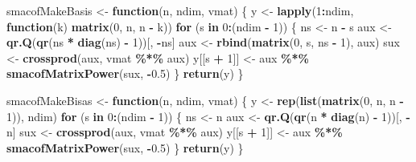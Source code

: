 \documentclass[
  12pt,
]{article}
\newenvironment{Shaded}{\begin{snugshade}}{\end{snugshade}}
\newcommand{\ControlFlowTok}[1]{\textcolor[rgb]{0.13,0.29,0.53}{\textbf{#1}}}
\newcommand{\DecValTok}[1]{\textcolor[rgb]{0.00,0.00,0.81}{#1}}
\newcommand{\FloatTok}[1]{\textcolor[rgb]{0.00,0.00,0.81}{#1}}
\newcommand{\FunctionTok}[1]{\textcolor[rgb]{0.13,0.29,0.53}{\textbf{#1}}}
\newcommand{\NormalTok}[1]{#1}
\newcommand{\OtherTok}[1]{\textcolor[rgb]{0.56,0.35,0.01}{#1}}
\newcommand{\SpecialCharTok}[1]{\textcolor[rgb]{0.81,0.36,0.00}{\textbf{#1}}}
\begin{document}
\begin{Shaded}
\begin{Highlighting}[]
\NormalTok{smacofMakeBasis }\OtherTok{\textless{}{-}} \ControlFlowTok{function}\NormalTok{(n, ndim, vmat) \{}
\NormalTok{  y }\OtherTok{\textless{}{-}} \FunctionTok{lapply}\NormalTok{(}\DecValTok{1}\SpecialCharTok{:}\NormalTok{ndim, }\ControlFlowTok{function}\NormalTok{(k)}
    \FunctionTok{matrix}\NormalTok{(}\DecValTok{0}\NormalTok{, n, n }\SpecialCharTok{{-}}\NormalTok{ k))}
  \ControlFlowTok{for}\NormalTok{ (s }\ControlFlowTok{in} \DecValTok{0}\SpecialCharTok{:}\NormalTok{(ndim }\SpecialCharTok{{-}} \DecValTok{1}\NormalTok{)) \{}
\NormalTok{    ns }\OtherTok{\textless{}{-}}\NormalTok{ n }\SpecialCharTok{{-}}\NormalTok{ s}
\NormalTok{    aux }\OtherTok{\textless{}{-}} \FunctionTok{qr.Q}\NormalTok{(}\FunctionTok{qr}\NormalTok{(ns }\SpecialCharTok{*} \FunctionTok{diag}\NormalTok{(ns) }\SpecialCharTok{{-}} \DecValTok{1}\NormalTok{))[, }\SpecialCharTok{{-}}\NormalTok{ns]}
\NormalTok{    aux }\OtherTok{\textless{}{-}} \FunctionTok{rbind}\NormalTok{(}\FunctionTok{matrix}\NormalTok{(}\DecValTok{0}\NormalTok{, s, ns }\SpecialCharTok{{-}} \DecValTok{1}\NormalTok{), aux)}
\NormalTok{    sux }\OtherTok{\textless{}{-}} \FunctionTok{crossprod}\NormalTok{(aux, vmat }\SpecialCharTok{\%*\%}\NormalTok{ aux)}
\NormalTok{    y[[s }\SpecialCharTok{+} \DecValTok{1}\NormalTok{]] }\OtherTok{\textless{}{-}}\NormalTok{ aux }\SpecialCharTok{\%*\%} \FunctionTok{smacofMatrixPower}\NormalTok{(sux, }\SpecialCharTok{{-}}\FloatTok{0.5}\NormalTok{)}
\NormalTok{  \}}
  \FunctionTok{return}\NormalTok{(y)}
\NormalTok{\}}

\NormalTok{smacofMakeBisas }\OtherTok{\textless{}{-}} \ControlFlowTok{function}\NormalTok{(n, ndim, vmat) \{}
\NormalTok{  y }\OtherTok{\textless{}{-}} \FunctionTok{rep}\NormalTok{(}\FunctionTok{list}\NormalTok{(}\FunctionTok{matrix}\NormalTok{(}\DecValTok{0}\NormalTok{, n, n }\SpecialCharTok{{-}} \DecValTok{1}\NormalTok{)), ndim)}
  \ControlFlowTok{for}\NormalTok{ (s }\ControlFlowTok{in} \DecValTok{0}\SpecialCharTok{:}\NormalTok{(ndim }\SpecialCharTok{{-}} \DecValTok{1}\NormalTok{)) \{}
\NormalTok{    ns }\OtherTok{\textless{}{-}}\NormalTok{ n}
\NormalTok{    aux }\OtherTok{\textless{}{-}} \FunctionTok{qr.Q}\NormalTok{(}\FunctionTok{qr}\NormalTok{(n }\SpecialCharTok{*} \FunctionTok{diag}\NormalTok{(n) }\SpecialCharTok{{-}} \DecValTok{1}\NormalTok{))[, }\SpecialCharTok{{-}}\NormalTok{n]}
\NormalTok{    sux }\OtherTok{\textless{}{-}} \FunctionTok{crossprod}\NormalTok{(aux, vmat }\SpecialCharTok{\%*\%}\NormalTok{ aux)}
\NormalTok{    y[[s }\SpecialCharTok{+} \DecValTok{1}\NormalTok{]] }\OtherTok{\textless{}{-}}\NormalTok{ aux }\SpecialCharTok{\%*\%} \FunctionTok{smacofMatrixPower}\NormalTok{(sux, }\SpecialCharTok{{-}}\FloatTok{0.5}\NormalTok{)}
\NormalTok{  \}}
  \FunctionTok{return}\NormalTok{(y)}
\NormalTok{\}}


\end{Highlighting}
\end{Shaded}
\end{document}

